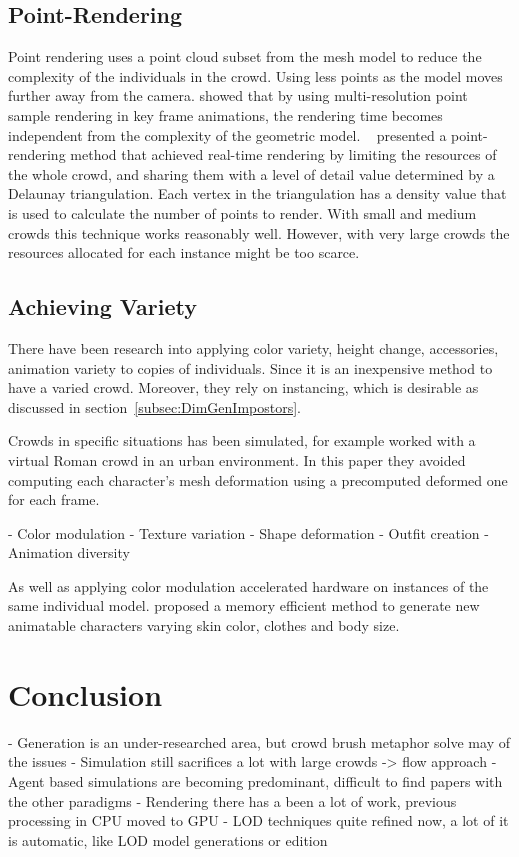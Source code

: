 \documentclass[6pt]{article}
\begin{document}
\begin{multicols}{2}
\subsection{Point-Rendering}

Point rendering uses a point cloud subset from the mesh model to reduce the complexity of the individuals in the crowd.
Using less points as the model moves further away from the camera.
\cite{Wand2002} showed that by using multi-resolution point sample rendering in key frame animations, the rendering time becomes independent from the complexity of the geometric model.
~\cite{Larkin2010} presented a point-rendering method that achieved real-time rendering by limiting the resources of the whole crowd, and sharing them with a level of detail value determined by a Delaunay triangulation. 
Each vertex in the triangulation has a density value that is used to calculate the number of points to render.
With small and medium crowds this technique works reasonably well.
However, with very large crowds the resources allocated for each instance might be too scarce.

\subsection{Achieving Variety}

There have been research into applying color variety, height change, accessories, animation variety to copies of individuals.
Since it is an inexpensive method to have a varied crowd.
Moreover, they rely on instancing, which is desirable as discussed in section~\ref{subsec:DimGenImpostors}.

Crowds in specific situations has been simulated, for example \cite{deHeras2005} worked with a virtual Roman crowd in an urban environment.
In this paper they avoided computing each character’s mesh deformation using a precomputed deformed one for each frame.

- Color modulation
- Texture variation
- Shape deformation
- Outfit creation
- Animation diversity

As well as applying color modulation accelerated hardware on instances of the same individual model.
\cite{ruiz2013} proposed a memory efficient method to generate new animatable characters varying skin color, clothes and body size.

\section{Conclusion}

- Generation is an under-researched area, but crowd brush metaphor solve may of the issues
- Simulation still sacrifices a lot with large crowds -> flow approach
- Agent based simulations are becoming predominant, difficult to find papers with the other paradigms
- Rendering there has a been a lot of work, previous processing in CPU moved to GPU
- LOD techniques quite refined now, a lot of it is automatic, like LOD model generations or edition

%


\end{multicols}
\end{document}
